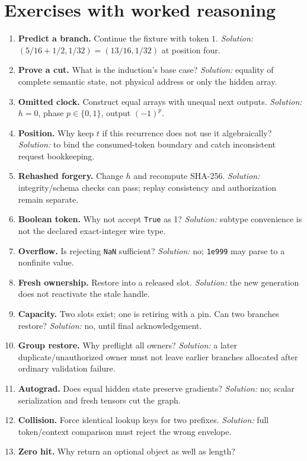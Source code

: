 \section{Exercises with worked reasoning}
\begin{enumerate}
\item \textbf{Predict a branch.} Continue the fixture with token $1$.
 \emph{Solution:} $(5/16+1/2,1/32)=(13/16,1/32)$ at position four.
\item \textbf{Prove a cut.} What is the induction's base case?
 \emph{Solution:} equality of complete semantic state, not physical address
 or only the hidden array.
\item \textbf{Omitted clock.} Construct equal arrays with unequal next outputs.
 \emph{Solution:} $h=0$, phase $p\in\{0,1\}$, output $(-1)^p$.
\item \textbf{Position.} Why keep $t$ if this recurrence does not use it
 algebraically? \emph{Solution:} to bind the consumed-token boundary and
 catch inconsistent request bookkeeping.
\item \textbf{Rehashed forgery.} Change $h$ and recompute SHA-256.
 \emph{Solution:} integrity/schema checks can pass; replay consistency and
 authorization remain separate.
\item \textbf{Boolean token.} Why not accept \texttt{True} as 1?
 \emph{Solution:} subtype convenience is not the declared exact-integer wire type.
\item \textbf{Overflow.} Is rejecting \texttt{NaN} sufficient?
 \emph{Solution:} no; \texttt{1e999} may parse to a nonfinite value.
\item \textbf{Fresh ownership.} Restore into a released slot.
 \emph{Solution:} the new generation does not reactivate the stale handle.
\item \textbf{Capacity.} Two slots exist; one is retiring with a pin.
 Can two branches restore? \emph{Solution:} no, until final acknowledgement.
\item \textbf{Group restore.} Why preflight all owners?
 \emph{Solution:} a later duplicate/unauthorized owner must not leave earlier
 branches allocated after ordinary validation failure.
\item \textbf{Autograd.} Does equal hidden state preserve gradients?
 \emph{Solution:} no; scalar serialization and fresh tensors cut the graph.
\item \textbf{Collision.} Force identical lookup keys for two prefixes.
 \emph{Solution:} full token/context comparison must reject the wrong envelope.
\item \textbf{Zero hit.} Why return an optional object as well as length?

\end{enumerate}
